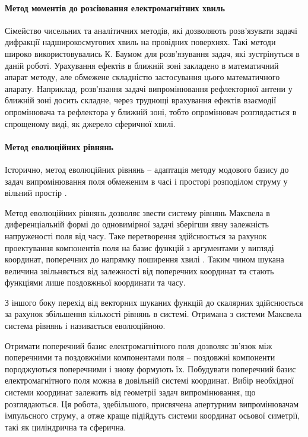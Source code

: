 \paragraph{Метод моментів до розсіювання електромагнітних хвиль}

Сімейство чисельних та аналітичних методів, які дозволяють розв'язувати
задачі дифракції надширокосмугових хвиль на провідних поверхнях.
Такі методи широко використовувались К. Баумом для розв'язування задач, які 
зустрінуться в даній роботі. Урахування ефектів в ближній зоні закладено в
математичний апарат методу, але обмежене складністю застосування цього 
математичного апарату. Наприклад, розв'язання задачі випромінювання 
рефлекторної антени у ближній зоні досить складне, через труднощі врахування 
ефектів взаємодії опромінювача та рефлектора у ближній зоні, тобто 
опромінювач розглядається в спрощеному виді, як джерело сферичної хвилі.

\paragraph{Метод еволюційних рівнянь}

Історично, метод еволюційних рівнянь -- адаптація методу модового базису 
\cite{imp:Tretyakov1986} до задач випромінювання поля обмеженим в часі і 
просторі розподілом струму у вільний простір \cite{imp:Tretyakov2004}.

Метод еволюційних рівнянь дозволяє звести систему рівнянь Максвела в 
диференціальній формі до одновимірної задачі зберігши явну залежність 
напруженості поля від часу. Таке перетворення здійснюється за рахунок 
проектування компонентів поля на базис функцій з аргументами у вигляді 
координат, поперечних до напрямку поширення хвилі \cite{imp:Dumin2010}. 
Таким чином шукана величина звільняється від залежності від поперечних 
координат та стають функціями лише поздовжньої координати та часу.

З іншого боку перехід від векторних шуканих функцій до скалярних здійснюється
за рахунок збільшення кількості рівнянь в системі. Отримана з системи Максвела
система рівнянь і називається еволюційною.

Отримати поперечний базис електромагнітного поля дозволяє зв'язок між 
поперечними та поздовжніми компонентами поля -- поздовжні компоненти 
породжуються поперечними і знову формують їх. 
Побудувати поперечний базис електромагнітного поля можна в довільній системі 
координат. Вибір необхідної системи координат залежить від геометрії задач 
випромінювання, що розглядаються. Ця робота, здебільшого, присвячена 
апертурним випромінювачам імпульсного струму, а отже краще підійдуть 
системи координат осьової симетрії, такі як циліндрична та сферична.

